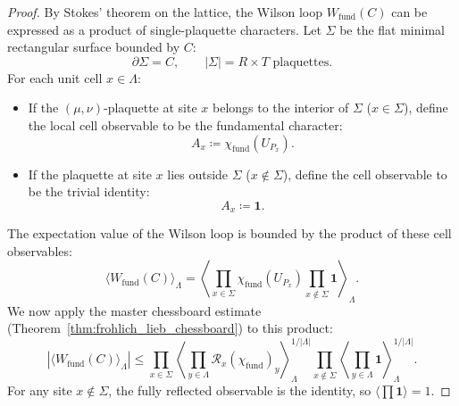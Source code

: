 \begin{proof}
By Stokes' theorem on the lattice, the Wilson loop $W_{\mathrm{fund}}(C)$ can be expressed as a product of single-plaquette characters. Let $\Sigma$ be the flat minimal rectangular surface bounded by $C$:
\begin{equation}
\partial \Sigma = C, \qquad |\Sigma| = R \times T \text{ plaquettes}.
\end{equation}
For each unit cell $x \in \Lambda$:
\begin{itemize}
    \item If the $(\mu, \nu)$-plaquette at site $x$ belongs to the interior of $\Sigma$ ($x \in \Sigma$), define the local cell observable to be the fundamental character:
    \begin{equation}
    A_x \coloneqq \chi_{\mathrm{fund}}(U_{P_x}).
    \end{equation}
    \item If the plaquette at site $x$ lies outside $\Sigma$ ($x \notin \Sigma$), define the cell observable to be the trivial identity:
    \begin{equation}
    A_x \coloneqq \mathbf{1}.
    \end{equation}
\end{itemize}
The expectation value of the Wilson loop is bounded by the product of these cell observables:
\begin{equation}
\langle W_{\mathrm{fund}}(C) \rangle_\Lambda = \left\langle \prod_{x \in \Sigma} \chi_{\mathrm{fund}}(U_{P_x}) \prod_{x \notin \Sigma} \mathbf{1} \right\rangle_\Lambda.
\end{equation}
We now apply the master chessboard estimate (Theorem~\ref{thm:frohlich_lieb_chessboard}) to this product:
\begin{equation}
\left| \langle W_{\mathrm{fund}}(C) \rangle_\Lambda \right| \le \prod_{x \in \Sigma} \left\langle \prod_{y \in \Lambda} \mathcal{R}_x(\chi_{\mathrm{fund}})_y \right\rangle_\Lambda^{1/|\Lambda|} \prod_{x \notin \Sigma} \left\langle \prod_{y \in \Lambda} \mathbf{1} \right\rangle_\Lambda^{1/|\Lambda|}.
\end{equation}
For any site $x \notin \Sigma$, the fully reflected observable is the identity, so $\langle \prod \mathbf{1} \rangle = 1$.


\end{proof}
